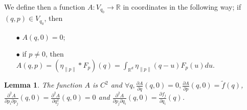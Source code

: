 \documentclass{dcds}
\newtheorem{lemma}[theorem]{Lemma}\newtheorem*{lem}{Lemma}
\theoremstyle{definition}
\begin{document}
 We define then a function $ A: V_{q_0}\rightarrow {\mathbb {R}}$ in coordinates in the following way; if $(q,p)\in V_{q_0}$, then
 \begin{enumerate}
 \item[$\bullet$] $A(q, 0)=0$;
 \item[$\bullet$] if $p\not=0$, then $A(q,p)=(\eta_{\| p\|}*F_p)(q)=\int_{{\mathbb {R}}^d} \eta_{\| p\|}(  q-u  )F_p(u)du$. \end{enumerate}
 \begin{lemma}\label{L4}
 The function $A$ is $C^2$ and $\forall q, \frac{\partial A}{\partial q}(q, 0)=0, \frac{\partial A}{\partial p}(q, 0)=\tilde f(q)$,\\ $\frac{\partial^2 A}{\partial p_i\partial p_j}(q,0)=\frac{\partial^2A}{\partial q_j^2}(q,0)=0$ and $\frac{\partial^2A}{\partial p_j\partial q_i}(q,0)=\frac{\partial f_j}{\partial q_i}(q)$.

 \end{lemma}
\end{document}
